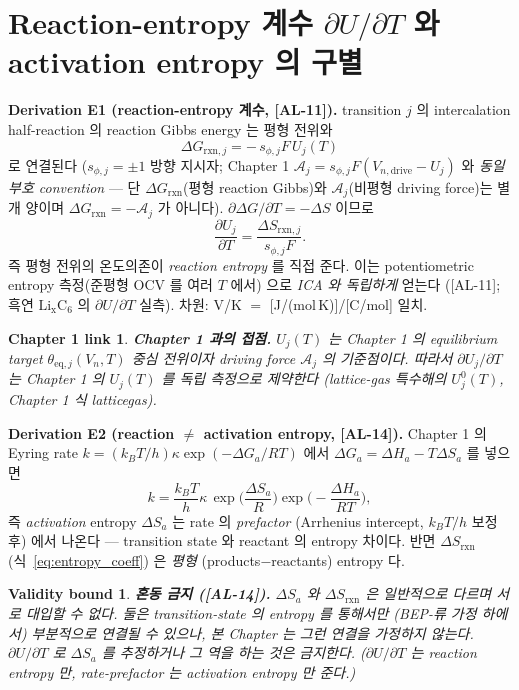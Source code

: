 \documentclass[11pt,a4paper]{article}
\newtheorem*{boundbox}{Validity bound}
\newtheorem*{linkbox}{Chapter 1 link}
\newcommand{\eq}{\mathrm{eq}}
\newcommand{\dimedrive}{\mathrm{drive}}
\newcommand{\rxn}{\mathrm{rxn}}
\newcommand{\AL}[1]{\textsf{[AL-#1]}}
\begin{document}
\section{Reaction-entropy 계수 $\partial U/\partial T$ 와 activation entropy 의 구별}\label{sec:entropy_coeff}
\textbf{Derivation E1 (reaction-entropy 계수, \AL{11}).} transition $j$ 의 intercalation
half-reaction 의 reaction Gibbs energy 는 평형 전위와
\begin{equation}
\Delta G_{\rxn,j}=-\,s_{\phi,j}F\,U_j(T)
\label{eq:dGrxn}
\end{equation}
로 연결된다 ($s_{\phi,j}=\pm1$ 방향 지시자; Chapter 1 $\mathcal A_j=s_{\phi,j}F(V_{n,\dimedrive}-U_j)$ 와
\emph{동일 부호 convention} — 단 $\Delta G_{\rxn}$(평형 reaction Gibbs)와 $\mathcal A_j$(비평형
driving force)는 별개 양이며 $\Delta G_\rxn=-\mathcal A_j$ 가 아니다). $\partial\Delta G/\partial T=-\Delta S$ 이므로
\begin{equation}
\boxed{\;\frac{\partial U_j}{\partial T}=\frac{\Delta S_{\rxn,j}}{s_{\phi,j}F}.\;}
\label{eq:entropy_coeff}
\end{equation}
즉 평형 전위의 온도의존이 \emph{reaction entropy} 를 직접 준다. 이는 potentiometric entropy
측정(준평형 OCV 를 여러 $T$ 에서) 으로 \emph{ICA 와 독립하게} 얻는다 \cite{reynier2003}
(\AL{11}; 흑연 $\mathrm{Li_xC_6}$ 의 $\partial U/\partial T$ 실측). 차원: V/K $=$ [J/(mol\,K)]/[C/mol] 일치.

\begin{linkbox}
\textbf{Chapter 1 과의 접점.} $U_j(T)$ 는 Chapter 1 의 equilibrium target $\theta_{\eq,j}(V_n,T)$
중심 전위이자 driving force $\mathcal A_j$ 의 기준점이다. 따라서 $\partial U_j/\partial T$ 는
Chapter 1 의 $U_j(T)$ 를 독립 측정으로 제약한다 (lattice-gas 특수해의 $U_j^0(T)$, Chapter 1
식 latticegas).
\end{linkbox}

\textbf{Derivation E2 (reaction $\ne$ activation entropy, \AL{14}).} Chapter 1 의 Eyring rate
\cite{eyring1935} $k=(k_BT/h)\kappa\exp(-\Delta G_a/RT)$ 에서 $\Delta G_a=\Delta H_a-T\Delta S_a$ 를 넣으면
\begin{equation}
k=\frac{k_BT}{h}\kappa\,\exp\!\Big(\frac{\Delta S_a}{R}\Big)\exp\!\Big(-\frac{\Delta H_a}{RT}\Big),
\label{eq:eyring_entropy}
\end{equation}
즉 \emph{activation} entropy $\Delta S_a$ 는 rate 의 \emph{prefactor} (Arrhenius intercept,
$k_BT/h$ 보정 후) 에서 나온다 — transition state 와 reactant 의 entropy 차이다. 반면
$\Delta S_{\rxn}$ (식~\eqref{eq:entropy_coeff}) 은 \emph{평형} (products$-$reactants) entropy 다.
\begin{boundbox}
\textbf{혼동 금지 (\AL{14}).} $\Delta S_a$ 와 $\Delta S_{\rxn}$ 은 일반적으로 \emph{다르며} 서로
대입할 수 없다. 둘은 transition-state 의 entropy 를 통해서만 (BEP-류 가정 하에서) 부분적으로
연결될 수 있으나, 본 Chapter 는 그런 연결을 \emph{가정하지 않는다}. $\partial U/\partial T$ 로
$\Delta S_a$ 를 추정하거나 그 역을 하는 것은 금지한다. ($\partial U/\partial T$ 는 reaction
entropy 만, rate-prefactor 는 activation entropy 만 준다.)
\end{boundbox}
\end{document}
